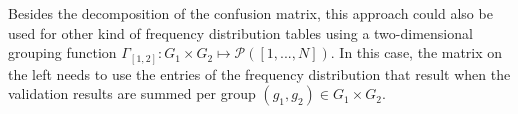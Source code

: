Besides the decomposition of the confusion matrix, this approach could also be used for other kind of frequency distribution tables using a two-dimensional grouping function $\Gamma_{[1,2]}: G_1 \times G_2 \mapsto \mathcal{P}([1,...,N])$. In this case, the matrix on the left needs to use the entries of the frequency distribution that result when the validation results are summed per group $(g_1,g_2) \in G_1 \times G_2$.